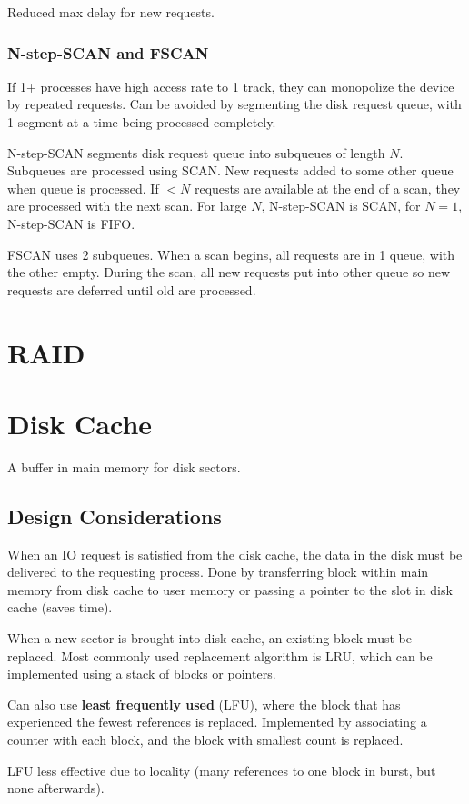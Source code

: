\documentclass[11pt]{article}
\begin{document}
Reduced max delay for new requests.
\subsubsection{N-step-SCAN and FSCAN}
\label{sec:orgc0daef5}
If 1+ processes have high access rate to 1 track, they can monopolize the device by
repeated requests.
Can be avoided by segmenting the disk request queue, with 1 segment at a time being
processed completely.

N-step-SCAN segments disk request queue into subqueues of length \(N\).
Subqueues are processed using SCAN.
New requests added to some other queue when queue is processed.
If \(<N\) requests are available at the end of a scan, they are processed with the next
scan.
For large \(N\), N-step-SCAN is SCAN, for \(N=1\), N-step-SCAN is FIFO.

FSCAN uses 2 subqueues.
When a scan begins, all requests are in 1 queue, with the other empty.
During the scan, all new requests put into other queue so new requests are deferred
until old are processed.
\section{RAID}
\label{sec:org22a3117}

\section{Disk Cache}
\label{sec:org97fc381}
A buffer in main memory for disk sectors.
\subsection{Design Considerations}
\label{sec:org1d680de}
When an IO request is satisfied from the disk cache, the data in the disk must be
delivered to the requesting process.
Done by transferring block within main memory from disk cache to user memory or
passing a pointer to the slot in disk cache (saves time).

When a new sector is brought into disk cache, an existing block must be replaced.
Most commonly used replacement algorithm is LRU, which can be implemented using
a stack of blocks or pointers.

Can also use \textbf{least frequently used} (LFU), where the block that has experienced
the fewest references is replaced.
Implemented by associating a counter with each block, and the block with smallest
count is replaced.

LFU less effective due to locality (many references to one block in burst, but
none afterwards).
\end{document}
